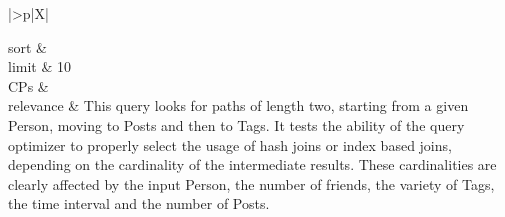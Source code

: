 \begin{tabularx}{\queryCardWidth}{|>{\queryPropertyCell}p{\queryPropertyCellWidth}|X|}
%
	
		sort		&
		\innerCardVSpace \\ \hline
	limit & 10 \\ \hline
	CPs &
	 \\ \hline
	relevance &
		\footnotesize This query looks for paths of length two, starting from a given Person, moving to Posts and then to Tags. It tests
the ability of the query optimizer to properly select the usage of hash joins or index based joins, depending on the
cardinality of the intermediate results. These cardinalities are clearly affected by the input Person, the number of
friends, the variety of Tags, the time interval and the number of Posts.
 \\ \hline%
\end{tabularx}
\queryCardVSpace

\let\emph\oldemph